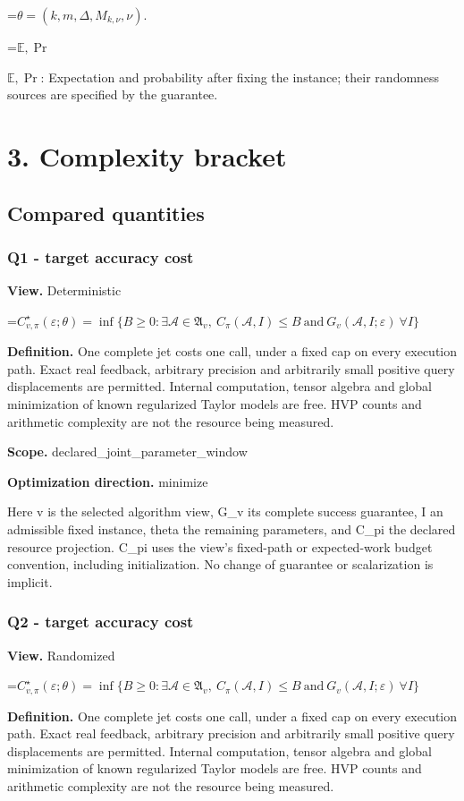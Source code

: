 \documentclass[10pt,a4paper]{article}
\newcommand{\AtlasMath}[1]{\par\begingroup\centering\setbox0=\hbox{$\displaystyle #1$}\ifdim\wd0>1.4\linewidth\typeout{ATLAS WIDE FORMULA: \the\wd0}\fi\ifdim\wd0>\linewidth\resizebox{\linewidth}{!}{\box0}\else\box0\fi\par\endgroup}
\newcommand{\AtlasInlineMath}[1]{\begingroup\setbox0=\hbox{$#1$}\ifdim\wd0>.4\linewidth\endgroup\AtlasMath{#1}\else\endgroup$#1$\fi}
\begin{document}
\AtlasMath{\theta=(k,m,\Delta,M_{k,\nu},\nu).}


\AtlasInlineMath{\mathbb{E},\Pr}: Expectation and probability after fixing the instance; their randomness sources are specified by the guarantee.

\section{3. Complexity bracket}
\subsection{Compared quantities}
\subsubsection{Q1 - target accuracy cost}
\textbf{View.} Deterministic

\AtlasMath{C^\star_{v,\pi}(\varepsilon;\theta)=\inf\{B\ge0:\exists\mathcal A\in\mathfrak A_v,\ C_\pi(\mathcal A,I)\le B\ \text{and}\ G_v(\mathcal A,I;\varepsilon)\ \forall I\}}
\textbf{Definition.} One complete jet costs one call, under a fixed cap on every execution path. Exact real feedback, arbitrary precision and arbitrarily small positive query displacements are permitted. Internal computation, tensor algebra and global minimization of known regularized Taylor models are free. HVP counts and arithmetic complexity are not the resource being measured.

\textbf{Scope.} declared\_joint\_parameter\_window

\textbf{Optimization direction.} minimize

Here v is the selected algorithm view, G\_v its complete success guarantee, I an admissible fixed instance, theta the remaining parameters, and C\_pi the declared resource projection. C\_pi uses the view's fixed-path or expected-work budget convention, including initialization. No change of guarantee or scalarization is implicit.

\subsubsection{Q2 - target accuracy cost}
\textbf{View.} Randomized

\AtlasMath{C^\star_{v,\pi}(\varepsilon;\theta)=\inf\{B\ge0:\exists\mathcal A\in\mathfrak A_v,\ C_\pi(\mathcal A,I)\le B\ \text{and}\ G_v(\mathcal A,I;\varepsilon)\ \forall I\}}
\textbf{Definition.} One complete jet costs one call, under a fixed cap on every execution path. Exact real feedback, arbitrary precision and arbitrarily small positive query displacements are permitted. Internal computation, tensor algebra and global minimization of known regularized Taylor models are free. HVP counts and arithmetic complexity are not the resource being measured.
\end{document}
